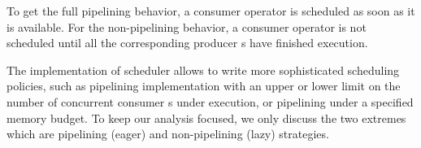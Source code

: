 To get the full pipelining behavior, a consumer operator \wo{} is scheduled as soon as it is available.
For the non-pipelining behavior, a consumer operator \wo{} is not scheduled until all the corresponding producer \wo{}s have finished execution. 

The implementation of \sys{} scheduler allows to write more sophisticated scheduling policies, such as pipelining implementation with an upper or lower limit on the number of concurrent consumer \wo{}s under execution, or pipelining under a specified memory budget.
To keep our analysis focused, we only discuss the two extremes which are pipelining (eager) and non-pipelining (lazy) strategies.